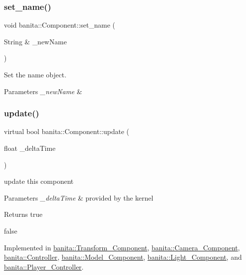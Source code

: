 \subsubsection{\texorpdfstring{set\_name()}{set\_name()}}
{\footnotesize\ttfamily void banita\+::\+Component\+::set\+\_\+name (\begin{DoxyParamCaption}\item[{String \&}]{\+\_\+new\+Name }\end{DoxyParamCaption})\hspace{0.3cm}{\ttfamily [inline]}}



Set the name object. 


\begin{DoxyParams}{Parameters}
{\em \+\_\+new\+Name} & \\
\hline
\end{DoxyParams}
\mbox{\label{classbanita_1_1_component_ae8f9d11dc8e3c920d6d40146668c429b}} 
\subsubsection{\texorpdfstring{update()}{update()}}
{\footnotesize\ttfamily virtual bool banita\+::\+Component\+::update (\begin{DoxyParamCaption}\item[{float}]{\+\_\+delta\+Time }\end{DoxyParamCaption})\hspace{0.3cm}{\ttfamily [pure virtual]}}



update this component 


\begin{DoxyParams}{Parameters}
{\em \+\_\+delta\+Time} & provided by the kernel \\
\hline
\end{DoxyParams}
\begin{DoxyReturn}{Returns}
true 

false 
\end{DoxyReturn}


Implemented in \mbox{\hyperlink{classbanita_1_1_transform___component_a0ca137a40cc84ee0825f37bab82d5d5d}{banita\+::\+Transform\+\_\+\+Component}}, \mbox{\hyperlink{classbanita_1_1_camera___component_a177f9d18f146b83d6dc08eab3c576cae}{banita\+::\+Camera\+\_\+\+Component}}, \mbox{\hyperlink{classbanita_1_1_controller_a44363ca0ed1ba66a9f6c079a6b158d94}{banita\+::\+Controller}}, \mbox{\hyperlink{classbanita_1_1_model___component_ab8acac6bf05bc01a8529235904b81a5b}{banita\+::\+Model\+\_\+\+Component}}, \mbox{\hyperlink{classbanita_1_1_light___component_a1cba9ef2cb6b798623899ad94f68df9f}{banita\+::\+Light\+\_\+\+Component}}, and \mbox{\hyperlink{classbanita_1_1_player___controller_ab7c47cba21892cac0e9f8a366cf86ca8}{banita\+::\+Player\+\_\+\+Controller}}.



